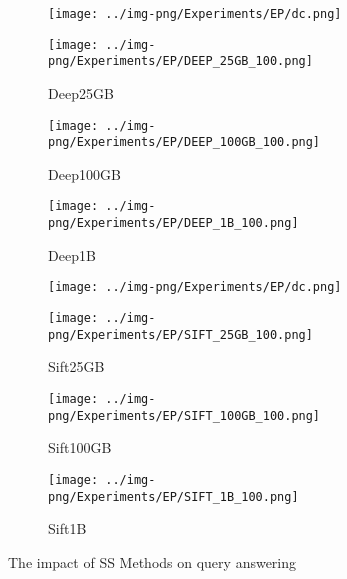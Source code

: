 \newcommand{\sfsix}{0.27\columnwidth}
\begin{figure}[tb]
	\captionsetup{justification=centering}
	\centering	
 		\begin{subfigure}{0.015\columnwidth}
			\centering
			\captionsetup{justification=centering}	
			\texttt{[image: ../img-png/Experiments/EP/dc.png]}
   \vspace{0.24in}
		\end{subfigure}	
		\begin{subfigure}{\sfsix}
			\centering
			\captionsetup{justification=centering}	
			\texttt{[image: ../img-png/Experiments/EP/DEEP\_25GB\_100.png]}
		\caption{{Deep25GB}}
		\label{fig:ss:deep25gb}
		\end{subfigure}	
		\begin{subfigure}{\sfsix}
			\centering
			\captionsetup{justification=centering}	
			\texttt{[image: ../img-png/Experiments/EP/DEEP\_100GB\_100.png]}
		\caption{{Deep100GB}}
		\label{fig:ss:deep100gb}
		\end{subfigure}	
		\begin{subfigure}{\sfsix}
			\centering
			\captionsetup{justification=centering}	
			\texttt{[image: ../img-png/Experiments/EP/DEEP\_1B\_100.png]}
		\caption{{Deep1B}}
		\label{fig:ss:deep1b}
		\end{subfigure}	
        
 		\begin{subfigure}{0.015\columnwidth}
			\centering
			\captionsetup{justification=centering}	
			\texttt{[image: ../img-png/Experiments/EP/dc.png]}
   \vspace{0.24in}
		\end{subfigure}	
		\begin{subfigure}{\sfsix}
			\centering
			\captionsetup{justification=centering}	
			\texttt{[image: ../img-png/Experiments/EP/SIFT\_25GB\_100.png]}
		\caption{{Sift25GB}}
		\label{fig:ss:sift25gbß}
		\end{subfigure}	
		\begin{subfigure}{\sfsix}
			\centering
			\captionsetup{justification=centering}	
			\texttt{[image: ../img-png/Experiments/EP/SIFT\_100GB\_100.png]}
		\caption{{Sift100GB}}
		\label{fig:ss:sift100gb}
		\end{subfigure}	
		\begin{subfigure}{\sfsix}
			\centering
			\captionsetup{justification=centering}	
			\texttt{[image: ../img-png/Experiments/EP/SIFT\_1B\_100.png]}
		\caption{{Sift1B}}
		\label{fig:ss:sift1b}
		\end{subfigure}	
\caption{The impact of SS Methods on query answering}
\label{fig:ss:search}
 \end{figure}
 


